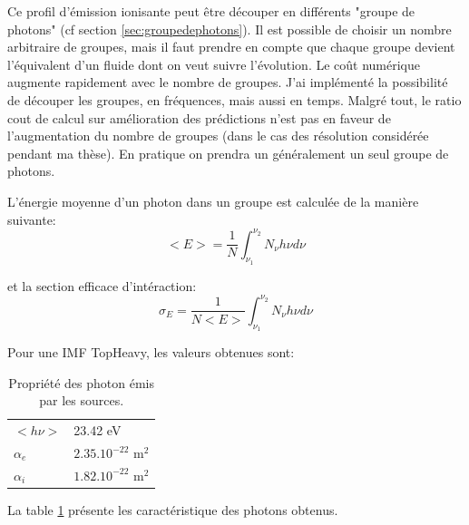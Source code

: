 Ce profil d’émission ionisante peut être découper en différents "groupe de photons" (cf section \ref{sec:groupedephotons}).
Il est possible de choisir un nombre arbitraire de groupes, mais il faut prendre en compte que chaque groupe devient l'équivalent d'un fluide dont on veut suivre l'évolution.
Le coût numérique augmente rapidement avec le nombre de groupes. 
J'ai implémenté la possibilité de découper les groupes, en fréquences, mais aussi en temps.
Malgré tout, le ratio cout de calcul sur amélioration des prédictions n'est pas en faveur de l'augmentation du nombre de groupes (dans le cas des résolution considérée pendant ma thèse).
En pratique on prendra un généralement un seul groupe de photons.

L’énergie moyenne d'un photon dans un groupe est calculée de la manière suivante:
\begin{equation}
<E> = \frac{1}{N} \int_{\nu_1}^{\nu_2} N_\nu h \nu d\nu
\end{equation}

et la section efficace d'intéraction:
\begin{equation}
\sigma_E = \frac{1}{N<E>} \int_{\nu_1}^{\nu_2} N_\nu h \nu d\nu
\end{equation}

Pour une IMF TopHeavy, les valeurs obtenues sont:


\begin{table}
\begin{tabular}{l l }
	$<h\nu>$	&  23.42 eV \\
	$\alpha_e$	&  $2.35.10^{-22}$ m$^2$ \\
	$\alpha_i$	&  $1.82.10^{-22}$ m$^2$ \\
\end{tabular}
\caption{Propriété des photon émis par les sources.
\label{tab_photon}}
\end{table}

La table \ref{tab_photon} présente les caractéristique des photons obtenus.






%


